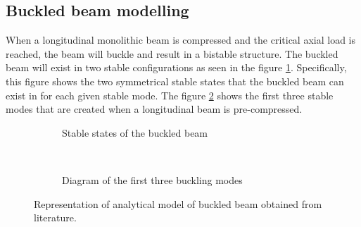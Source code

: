 
\subsection{Buckled beam modelling}
When a longitudinal monolithic beam is compressed and the critical axial load is reached, the beam will buckle and result in a bistable structure. The buckled beam will exist in two stable configurations as seen in the figure \ref{fig:States_Schema}. Specifically, this figure shows the two symmetrical stable states that the buckled beam can exist in for each given stable mode. The figure \ref{fig:Modes_Schema} shows the first three stable modes that are created when a longitudinal beam is pre-compressed.

\begin{figure}[H]
 \centering
 \begin{subfigure}[t]{0.45\textwidth}
   {\tiny
   \def\svgwidth{\textwidth}
   
   }
   \vspace{-10pt}
   \caption{Stable states of the buckled beam}
   \label{fig:States_Schema}
 \end{subfigure}
	~
 \begin{subfigure}[t]{0.45\textwidth}
   {\tiny
   \def\svgwidth{\textwidth}
   
   }
   \vspace{-10pt}
   \caption{Diagram of the first three buckling modes}
   \label{fig:Modes_Schema}
  \end{subfigure}
	\caption{Representation of analytical model of buckled beam obtained from literature\cite{timoshenko_theory_1962}.}
	\label{fig:Buckled_Beam}
\end{figure}

